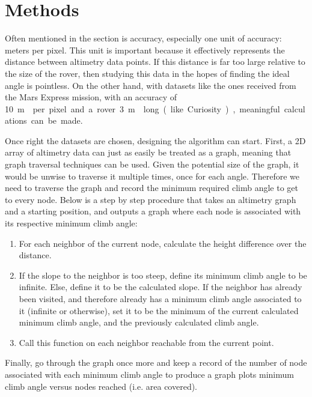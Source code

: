 \documentclass[12pt, twocolumn]{article}
\begin{document}

\section{Methods}
\label{sec:methods}
\par Often mentioned in the  section is accuracy, especially one unit of accuracy: meters per pixel. This unit is important because it effectively represents the distance between altimetry data points. If this distance is far too large relative to the size of the rover, then studying this data in the hopes of finding the ideal angle is pointless. On the other hand, with datasets like the ones received from the Mars Express mission, with an accuracy of \SI{10}\m{} per pixel and a rover \SI{3}\m{} long (like Curiosity), meaningful calculations can be made.
\par Once right the datasets are chosen, designing the algorithm can start. First, a 2D array of altimetry data can just as easily be treated as a graph, meaning that graph traversal techniques can be used. Given the potential size of the graph, it would be unwise to traverse it multiple times, once for each angle. Therefore we need to traverse the graph and record the minimum required climb angle to get to every node. Below is a step by step procedure that takes an altimetry graph and a starting position, and outputs a graph where each node is associated with its respective minimum climb angle:
\begin{enumerate}
  \item For each neighbor of the current node, calculate the height difference over the distance.
  \item If the slope to the neighbor is too steep, define its minimum climb angle to be infinite. Else, define it to be the calculated slope. If the neighbor has already been visited, and therefore already has a minimum climb angle associated to it (infinite or otherwise), set it to be the minimum of the current calculated minimum climb angle, and the previously calculated climb angle.
  \item Call this function on each neighbor reachable from the current point.
\end{enumerate}
Finally, go through the graph once more and keep a record of the number of node associated with each minimum climb angle to produce a graph plots minimum climb angle versus nodes reached (i.e. area covered).
\end{document}
